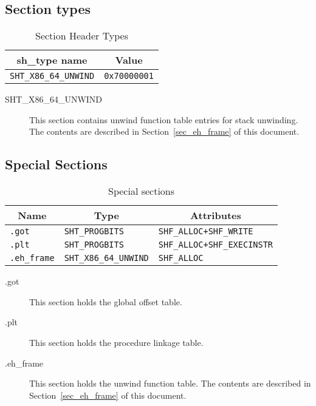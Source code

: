 \subsection{Section types}

\begin{table}[H]
\Hrule
  \caption{Section Header Types}
  \begin{center}
    \begin{tabular}[t]{l|l}
      \multicolumn{1}{c}{sh_type name} & \multicolumn{1}{c}{Value} \\
      \hline
      \texttt{SHT_X86_64_UNWIND} & \texttt{0x70000001}
    \end{tabular}
  \end{center}
\Hrule
\end{table}

\begin{description}
 \item[SHT_X86_64_UNWIND]
        This section contains unwind function table entries for
        stack unwinding.  The contents are described in
        Section~\ref{sec_eh_frame} of this document.
\end{description}

\subsection{Special Sections}

\begin{table}[H]
\Hrule
  \caption{Special sections}
  \begin{center}
    \begin{tabular}[t]{l|l|l}
      \multicolumn{1}{c}{Name} & \multicolumn{1}{c}{Type}
       & \multicolumn{1}{c}{Attributes} \\
      \hline
      \texttt{.got} & \texttt{SHT_PROGBITS} & \texttt{SHF_ALLOC+SHF_WRITE} \\
      \texttt{.plt}&\texttt{SHT_PROGBITS} & \texttt{SHF_ALLOC+SHF_EXECINSTR} \\
      \texttt{.eh_frame} & \texttt{SHT_X86_64_UNWIND} & \texttt{SHF_ALLOC}
    \end{tabular}
  \end{center}
\Hrule
\end{table}

\begin{description}
 \item[.got] This section holds the global offset table.
 \item[.plt] This section holds the procedure linkage table.
 \item[.eh_frame] This section holds the unwind function table.
                      The contents are described in Section~\ref{sec_eh_frame}
                      of this document.
\end{description}

